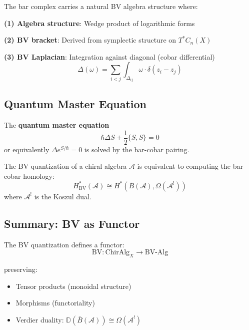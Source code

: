 \begin{theorem}
\label{thm:config-space-bv}
The bar complex carries a natural BV algebra structure where:

\textbf{(1) Algebra structure}: Wedge product of logarithmic forms

\textbf{(2) BV bracket}: Derived from symplectic structure on $T^*C_n(X)$

\textbf{(3) BV Laplacian}: Integration against diagonal (cobar differential)
$$\Delta(\omega) = \sum_{i < j} \int_{\Delta_{ij}} \omega \cdot \delta(z_i - z_j)$$
\end{theorem}

\subsection{Quantum Master Equation}

\begin{theorem}
\label{thm:quantum-master-complete}
The \textbf{quantum master equation}
$$\hbar \Delta S + \frac{1}{2}\{S, S\} = 0$$
or equivalently $\Delta e^{S/\hbar} = 0$
is solved by the bar-cobar pairing.
\end{theorem}

\begin{corollary}[BV Quantization = Bar-Cobar Duality]
\label{cor:bv-equals-bar-cobar}
The BV quantization of a chiral algebra $\mathcal{A}$ is equivalent to computing the 
bar-cobar homology:
$$H^*_{\text{BV}}(\mathcal{A}) \cong H^*(\bar{B}(\mathcal{A}), \Omega(\mathcal{A}^!))$$
where $\mathcal{A}^!$ is the Koszul dual.
\end{corollary}

\subsection{Summary: BV as Functor}

\begin{theorem}[BV Functor]
\label{thm:bv-functor}
The BV quantization defines a functor:
$$\text{BV}: \text{ChirAlg}_X \longrightarrow \text{BV-Alg}$$

preserving:
\begin{itemize}
\item Tensor products (monoidal structure)
\item Morphisms (functoriality)
\item Verdier duality: $\mathbb{D}(\bar{B}(\mathcal{A})) \cong \Omega(\mathcal{A}^!)$
\end{itemize}
\end{theorem}

